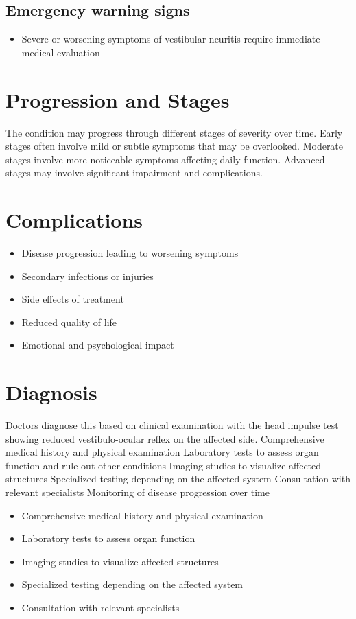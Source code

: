 \subsection{Emergency warning signs}
\begin{itemize}[noitemsep]
  \item Severe or worsening symptoms of vestibular neuritis require immediate medical evaluation
\end{itemize}
\section{Progression and Stages}
The condition may progress through different stages of severity over time. Early stages often involve mild or subtle symptoms that may be overlooked. Moderate stages involve more noticeable symptoms affecting daily function. Advanced stages may involve significant impairment and complications.
\section{Complications}
\begin{itemize}[noitemsep]
  \item Disease progression leading to worsening symptoms
  \item Secondary infections or injuries
  \item Side effects of treatment
  \item Reduced quality of life
  \item Emotional and psychological impact
\end{itemize}
\section{Diagnosis}
Doctors diagnose this based on clinical examination with the head impulse test showing reduced vestibulo-ocular reflex on the affected side. Comprehensive medical history and physical examination Laboratory tests to assess organ function and rule out other conditions Imaging studies to visualize affected structures Specialized testing depending on the affected system Consultation with relevant specialists Monitoring of disease progression over time

\begin{itemize}[noitemsep]
  \item Comprehensive medical history and physical examination
  \item Laboratory tests to assess organ function
  \item Imaging studies to visualize affected structures
  \item Specialized testing depending on the affected system
  \item Consultation with relevant specialists
\end{itemize}
